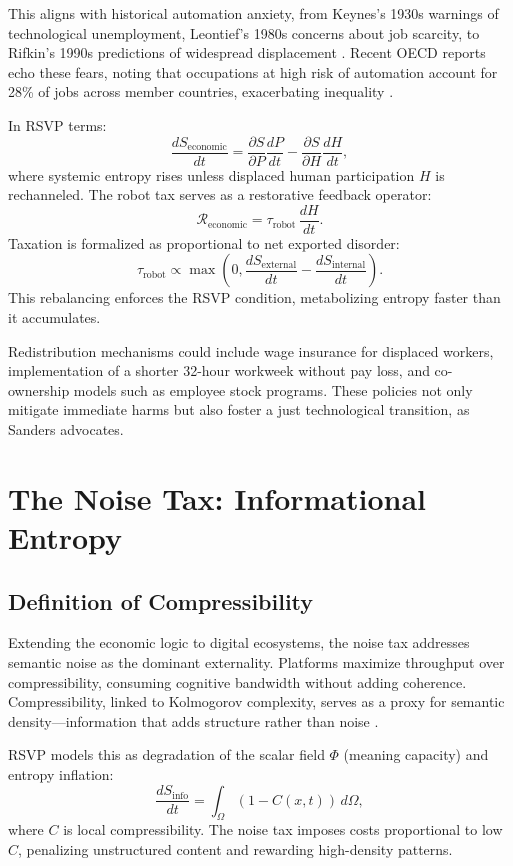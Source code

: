 \documentclass[12pt]{article}
\begin{document}
This aligns with historical automation anxiety, from Keynes's 1930s warnings of technological unemployment, Leontief's 1980s concerns about job scarcity, to Rifkin's 1990s predictions of widespread displacement \citep{keynes1930economic, leontief1983technological, rifkin1995end}. Recent OECD reports echo these fears, noting that occupations at high risk of automation account for 28\% of jobs across member countries, exacerbating inequality \citep{oecd2025future}.

In RSVP terms:
\[
\frac{dS_\text{economic}}{dt} = \frac{\partial S}{\partial P} \frac{dP}{dt} - \frac{\partial S}{\partial H} \frac{dH}{dt},
\]
where systemic entropy rises unless displaced human participation $H$ is rechanneled. The robot tax serves as a restorative feedback operator:
\[
\mathcal{R}_\text{economic} = \tau_\text{robot} \, \frac{dH}{dt}.
\]
Taxation is formalized as proportional to net exported disorder:
\[
\tau_{\text{robot}} \propto \max\left(0, \frac{dS_{\text{external}}}{dt} - \frac{dS_{\text{internal}}}{dt}\right).
\]
This rebalancing enforces the RSVP condition, metabolizing entropy faster than it accumulates.

Redistribution mechanisms could include wage insurance for displaced workers, implementation of a shorter 32-hour workweek without pay loss, and co-ownership models such as employee stock programs. These policies not only mitigate immediate harms but also foster a just technological transition, as Sanders advocates.

\section{The Noise Tax: Informational Entropy}

\subsection{Definition of Compressibility}
Extending the economic logic to digital ecosystems, the noise tax addresses semantic noise as the dominant externality. Platforms maximize throughput over compressibility, consuming cognitive bandwidth without adding coherence. Compressibility, linked to Kolmogorov complexity, serves as a proxy for semantic density—information that adds structure rather than noise \citep{kolmogorov1965complexity}.

RSVP models this as degradation of the scalar field $\Phi$ (meaning capacity) and entropy inflation:
\[
\frac{dS_\text{info}}{dt} = \int_\Omega (1 - C(x,t)) \, d\Omega,
\]
where $C$ is local compressibility. The noise tax imposes costs proportional to low $C$, penalizing unstructured content and rewarding high-density patterns.
\end{document}
